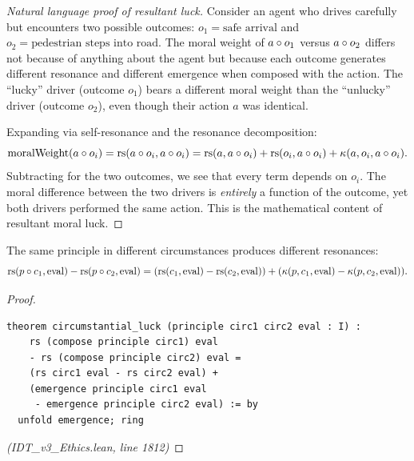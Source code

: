 \begin{proof}[Natural language proof of resultant luck]
Consider an agent who drives carefully but encounters two possible outcomes:
$o_1 = \text{safe arrival}$ and $o_2 = \text{pedestrian steps into road}$.
The moral weight of $a \circ o_1$ versus $a \circ o_2$ differs not
because of anything about the agent but because each outcome generates
different resonance and different emergence when composed with the action.
The ``lucky'' driver (outcome $o_1$) bears a different moral weight than
the ``unlucky'' driver (outcome $o_2$), even though their action $a$ was
identical.

Expanding via self-resonance and the resonance decomposition:
\[
  \mathrm{moralWeight}(a \circ o_i) = \mathrm{rs}(a \circ o_i, a \circ o_i)
  = \mathrm{rs}(a, a \circ o_i) + \mathrm{rs}(o_i, a \circ o_i) + \kappa(a, o_i, a \circ o_i).
\]
Subtracting for the two outcomes, we see that every term depends on $o_i$.
The moral difference between the two drivers is \emph{entirely} a function
of the outcome, yet both drivers performed the same action. This is the
mathematical content of resultant moral luck.
\end{proof}

\begin{theorem}
\label{thm:circumstantial-luck}
The same principle in different circumstances produces different resonances:
\[
  \mathrm{rs}(p \circ c_1, \mathrm{eval}) - \mathrm{rs}(p \circ c_2, \mathrm{eval})
  = (\mathrm{rs}(c_1, \mathrm{eval}) - \mathrm{rs}(c_2, \mathrm{eval}))
  + (\kappa(p, c_1, \mathrm{eval}) - \kappa(p, c_2, \mathrm{eval})).
\]
\end{theorem}

\begin{proof}
\begin{lstlisting}
theorem circumstantial_luck (principle circ1 circ2 eval : I) :
    rs (compose principle circ1) eval
    - rs (compose principle circ2) eval =
    (rs circ1 eval - rs circ2 eval) +
    (emergence principle circ1 eval
     - emergence principle circ2 eval) := by
  unfold emergence; ring
\end{lstlisting}
\textit{(IDT\_v3\_Ethics.lean, line 1812)}
\end{proof}

